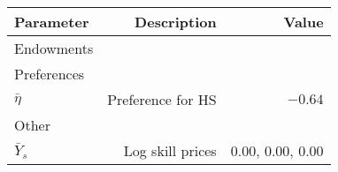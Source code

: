 \begin{tabular}{lrr}
\hline
Parameter & Description  & Value  \\ 
\hline
Endowments &   &   \\ 
Preferences &   &   \\ 
$\bar{\eta}$ & Preference for HS  & $-0.64$  \\ 
Other &   &   \\ 
$\bar{Y}_{s}$ & Log skill prices  & 0.00, 0.00, 0.00  \\ 
\hline
\end{tabular}%

